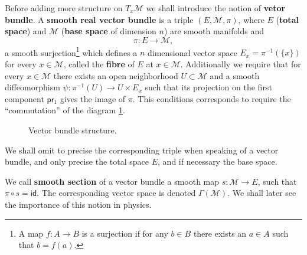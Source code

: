 \documentclass[12pt]{book}
\newcommand{\id}{\mathsf{id}}
\newcommand{\Mcal}{\mathcal{M}}
\newcommand{\psf}{\mathsf{p}}
\newcommand{\rsf}{\mathsf{r}}
\theoremstyle{break}
\begin{document}
Before adding more structure on $T_x \Mcal$ we shall introduce the notion of \textbf{vetor bundle}. A \textbf{smooth real vector bundle} is a triple $(E,\Mcal,\pi)$, where $E$ (\textbf{total space}) and $\Mcal$ (\textbf{base space} of dimension $n$) are smooth manifolds and 
%
\begin{equation*}
\pi : E \to \Mcal , 
\end{equation*}
%
a smooth surjection\footnote{A map $f : A \to B$ is a surjection if for any $b \in B$ there exists an $a\in A$ such that $b=f(a)$.} which defines a $n$ dimensional vector space $E_x = \pi^{-1}(\{x\})$ for every $x \in \Mcal$, called the \textbf{fibre} of $E$ at $x\in\Mcal$. Additionally we require that for every $x\in\Mcal$ there exists an open neighborhood $U \subset \Mcal$ and a smooth diffeomorphism $\psi : \pi^{-1}(U) \to U \times E_x$ such that its projection on the first component $\psf\rsf_1$ gives the image of $\pi$. This conditions corresponds to require the ``commutation'' of the diagram \ref{fig:vect_bund_strut}.


\begin{figure}[ht!]
\begin{center}
\end{center}
\caption{Vector bundle structure.}
\label{fig:vect_bund_strut}
\end{figure}


We shall omit to precise the corresponding triple when speaking of a vector bundle, and only precise the total space $E$, and if necessary the base space.




We call \textbf{smooth section} of a vector bundle a smooth map $s : \Mcal \to E$, such that $\pi \circ s = \id$. The corresponding vector space is denoted $\Gamma(\Mcal)$. We shall later see the importance of this notion in physics.
\end{document}
